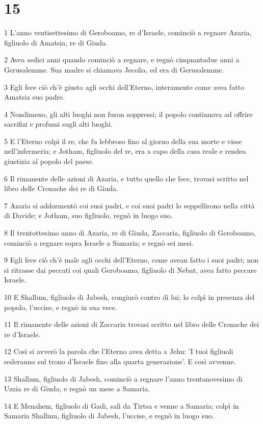 \chapter{15}

\par 1 L'anno ventisettesimo di Geroboamo, re d'Israele, cominciò a regnare Azaria, figliuolo di Amatsia, re di Giuda.
\par 2 Avea sedici anni quando cominciò a regnare, e regnò cinquantadue anni a Gerusalemme. Sua madre si chiamava Jecolia, ed era di Gerusalemme.
\par 3 Egli fece ciò ch'è giusto agli occhi dell'Eterno, interamente come avea fatto Amatsia suo padre.
\par 4 Nondimeno, gli alti luoghi non furon soppressi; il popolo continuava ad offrire sacrifizi e profumi sugli alti luoghi.
\par 5 E l'Eterno colpì il re, che fu lebbroso fino al giorno della sua morte e visse nell'infermeria; e Jotham, figliuolo del re, era a capo della casa reale e rendea giustizia al popolo del paese.
\par 6 Il rimanente delle azioni di Azaria, e tutto quello che fece, trovasi scritto nel libro delle Cronache dei re di Giuda.
\par 7 Azaria si addormentò coi suoi padri, e coi suoi padri lo seppellirono nella città di Davide; e Jotham, suo figliuolo, regnò in luogo suo.
\par 8 Il trentottesimo anno di Azaria, re di Giuda, Zaccaria, figliuolo di Geroboamo, cominciò a regnare sopra Israele a Samaria; e regnò sei mesi.
\par 9 Egli fece ciò ch'è male agli occhi dell'Eterno, come avean fatto i suoi padri; non si ritrasse dai peccati coi quali Geroboamo, figliuolo di Nebat, avea fatto peccare Israele.
\par 10 E Shallum, figliuolo di Jabesh, congiurò contro di lui; lo colpì in presenza del popolo, l'uccise, e regnò in sua vece.
\par 11 Il rimanente delle azioni di Zaccaria trovasi scritto nel libro delle Cronache dei re d'Israele.
\par 12 Così si avverò la parola che l'Eterno avea detta a Jehu: 'I tuoi figliuoli sederanno sul trono d'Israele fino alla quarta generazione'. E così avvenne.
\par 13 Shallum, figliuolo di Jabesh, cominciò a regnare l'anno trentanovesimo di Uzzia re di Giuda, e regnò un mese a Samaria.
\par 14 E Menahem, figliuolo di Gadi, salì da Tirtsa e venne a Samaria; colpì in Samaria Shallum, figliuolo di Jabesh, l'uccise, e regnò in luogo suo.
